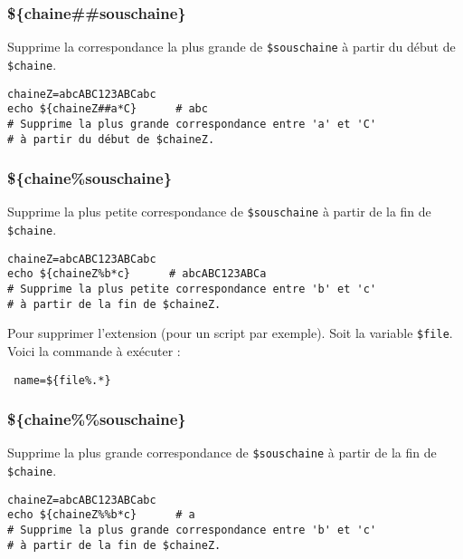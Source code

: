 \documentclass[a4paper,twoside]{article}
\begin{document}
\subsubsection{\$\{chaine\#\#souschaine\}}
Supprime la correspondance la plus grande de \verb|$souschaine| à partir du début de \verb|$chaine|.

\begin{exemple}
\begin{verbatim}
chaineZ=abcABC123ABCabc
echo ${chaineZ##a*C}      # abc
# Supprime la plus grande correspondance entre 'a' et 'C'
# à partir du début de $chaineZ.
\end{verbatim}
\end{exemple}

\subsubsection{\$\{chaine\%souschaine\}}
Supprime la plus petite correspondance de \verb|$souschaine| à partir de la fin de \verb|$chaine|.

\begin{exemple}
\begin{verbatim}
chaineZ=abcABC123ABCabc
echo ${chaineZ%b*c}      # abcABC123ABCa
# Supprime la plus petite correspondance entre 'b' et 'c'
# à partir de la fin de $chaineZ.
\end{verbatim}
\end{exemple}


\begin{remarque}
Pour supprimer l'extension (pour un script par exemple). Soit la variable \texttt{\$file}. Voici la commande à exécuter :

\verb| name=${file%.*}|
\end{remarque}


\subsubsection{\$\{chaine\%\%souschaine\}}
Supprime la plus grande correspondance de \verb|$souschaine| à partir de la fin de \verb|$chaine|.

\begin{exemple}
\begin{verbatim}
chaineZ=abcABC123ABCabc
echo ${chaineZ%%b*c}      # a
# Supprime la plus grande correspondance entre 'b' et 'c'
# à partir de la fin de $chaineZ.
\end{verbatim}
\end{exemple}
\end{document}
